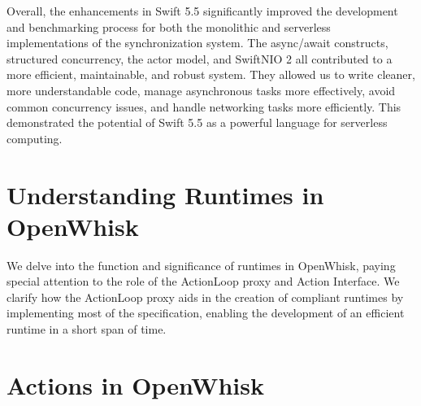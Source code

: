Overall, the enhancements in Swift 5.5 significantly improved the development and benchmarking process for both the monolithic and serverless implementations of the synchronization system. The async/await constructs, structured concurrency, the actor model, and SwiftNIO 2 all contributed to a more efficient, maintainable, and robust system. They allowed us to write cleaner, more understandable code, manage asynchronous tasks more effectively, avoid common concurrency issues, and handle networking tasks more efficiently. This demonstrated the potential of Swift 5.5 as a powerful language for serverless computing.

\section{Understanding Runtimes in OpenWhisk}
\label{sec:OpenWhiskRuntimes}

We delve into the function and significance of runtimes in OpenWhisk, paying special attention to the role of the ActionLoop proxy and Action Interface. We clarify how the ActionLoop proxy aids in the creation of compliant runtimes by implementing most of the specification, enabling the development of an efficient runtime in a short span of time.
\section{Actions in OpenWhisk}

